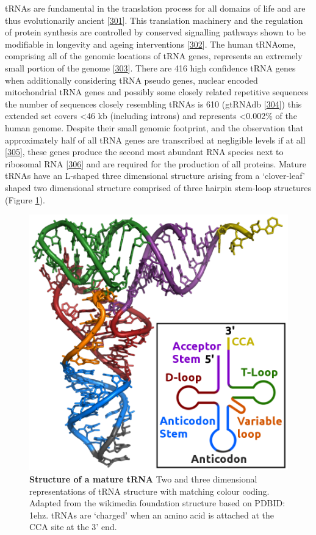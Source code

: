 \documentclass[
]{book}
\begin{document}
tRNAs are fundamental in the translation process for all domains of life and are thus evolutionarily ancient {[}\protect\hyperlink{ref-Eigen1989}{301}{]}.
This translation machinery and the regulation of protein synthesis are controlled by conserved signalling pathways shown to be modifiable in longevity and ageing interventions {[}\protect\hyperlink{ref-Tavernarakis2008}{302}{]}.
The human tRNAome, comprising all of the genomic locations of tRNA genes, represents an extremely small portion of the genome {[}\protect\hyperlink{ref-Parisien2013}{303}{]}.
There are 416 high confidence tRNA genes when additionally considering tRNA pseudo genes, nuclear encoded mitochondrial tRNA genes and possibly some closely related repetitive sequences the number of sequences closely resembling tRNAs is 610 (gtRNAdb {[}\protect\hyperlink{ref-Chan2009}{304}{]}) this extended set covers \textless46 kb (including introns) and represents \textless0.002\% of the human genome.
Despite their small genomic footprint, and the observation that approximately half of all tRNA genes are transcribed at negligible levels if at all {[}\protect\hyperlink{ref-Torres2019a}{305}{]}, these genes produce the second most abundant RNA species next to ribosomal RNA {[}\protect\hyperlink{ref-Lodish2000}{306}{]} and are required for the production of all proteins.
Mature tRNAs have an L-shaped three dimensional structure arising from a `clover-leaf' shaped two dimensional structure comprised of three hairpin stem-loop structures (Figure \ref{fig:tRNAstructure}).

\begin{figure}

{\centering \includegraphics[width=0.7\linewidth]{./figs/910px-TRNA-Phe_yeast_1ehz_RJA_white} 

}

\caption{\textbf{Structure of a mature tRNA} Two and three dimensional representations of tRNA structure with matching colour coding. Adapted from the wikimedia foundation structure based on PDBID: 1ehz. tRNAs are `charged' when an amino acid is attached at the CCA site at the 3' end.}\label{fig:tRNAstructure}
\end{figure}
\end{document}
